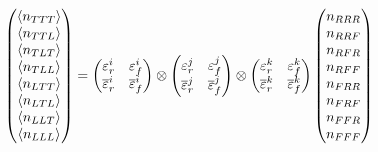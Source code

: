\begin{equation}
\begin{pmatrix} 
  \langle n_{TTT}\rangle \\
  \langle n_{TTL}\rangle \\
  \langle n_{TLT}\rangle \\
  \langle n_{TLL}\rangle \\
  \langle n_{LTT}\rangle \\
  \langle n_{LTL}\rangle \\
  \langle n_{LLT}\rangle \\
  \langle n_{LLL}\rangle
  \end{pmatrix} 
  =
  \begin{pmatrix}
  \varepsilon_r^i & \varepsilon_f^i \\ \overline{\varepsilon}_r^i & \overline{\varepsilon}_f^i
  \end{pmatrix} 
  \otimes
  \begin{pmatrix}
  \varepsilon_r^j & \varepsilon_f^j \\ \overline{\varepsilon}_r^j & \overline{\varepsilon}_f^j
  \end{pmatrix} 
  \otimes
  \begin{pmatrix}
  \varepsilon_r^k & \varepsilon_f^k \\ \overline{\varepsilon}_r^k & \overline{\varepsilon}_f^k
  \end{pmatrix} 
  \begin{pmatrix} 
  n_{RRR}\\
  n_{RRF}\\
  n_{RFR}\\
  n_{RFF}\\
  n_{FRR}\\
  n_{FRF}\\
  n_{FFR}\\
  n_{FFF}
  \end{pmatrix}
\end{equation}

